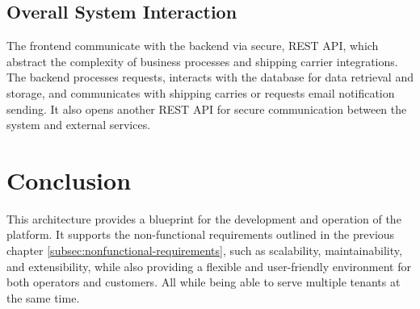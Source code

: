 \subsection{Overall System Interaction}
The frontend communicate with the backend via secure, REST API, which abstract the complexity of business processes and shipping carrier integrations.
The backend processes requests, interacts with the database for data retrieval and storage, and communicates with shipping carries or requests email notification sending.
It also opens another REST API for secure communication between the system and external services.

\section{Conclusion}
This architecture provides a blueprint for the development and operation of the platform. 
It supports the non-functional requirements outlined in the previous chapter \ref{subsec:nonfunctional-requirements}, such as scalability, maintainability, and extensibility, while also providing a flexible and user-friendly environment for both operators and customers.
All while being able to serve multiple tenants at the same time.